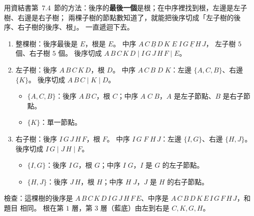 \begin{pastsoln}
用資結書第~7.4~節的方法：後序的\textbf{最後一個}是根；在中序裡找到根，左邊是左子樹、右邊是右子樹；
兩棵子樹的節點數知道了，就能把後序切成「左子樹的後序、右子樹的後序、根」。 一直遞迴下去。
\begin{enumerate}
\item 整棵樹：後序最後是 $E$，根是 $E$。 中序 $\underline{A\,C\,B\,D\,K}\;E\;\underline{I\,G\,F\,H\,J}$，
左子樹 $5$ 個、右子樹 $5$ 個。 後序切成 $A\,B\,C\,K\,D \mid I\,G\,J\,H\,F \mid E$。
\item 左子樹：後序 $A\,B\,C\,K\,D$，根 $D$。 中序 $A\,C\,B\;D\;K$：左邊 $\{A, C, B\}$、右邊 $\{K\}$。
後序切成 $A\,B\,C \mid K \mid D$。
\begin{itemize}
\item $\{A, C, B\}$：後序 $A\,B\,C$，根 $C$；中序 $A\;C\;B$，$A$ 是左子節點、$B$ 是右子節點。
\item $\{K\}$：單一節點。
\end{itemize}
\item 右子樹：後序 $I\,G\,J\,H\,F$，根 $F$。 中序 $I\,G\;F\;H\,J$：左邊 $\{I, G\}$、右邊 $\{H, J\}$。
後序切成 $I\,G \mid J\,H \mid F$。
\begin{itemize}
\item $\{I, G\}$：後序 $I\,G$，根 $G$；中序 $I\;G$，$I$ 是 $G$ 的左子節點。
\item $\{H, J\}$：後序 $J\,H$，根 $H$；中序 $H\;J$，$J$ 是 $H$ 的右子節點。
\end{itemize}
\end{enumerate}
\begin{center}
\end{center}
檢查：這棵樹的後序是 $A\,B\,C\,K\,D\,I\,G\,J\,H\,F\,E$、中序是 $A\,C\,B\,D\,K\,E\,I\,G\,F\,H\,J$，和題目
相同。 根在第 $1$ 層，第 $3$ 層（藍底）由左到右是 $C, K, G, H$。
\end{pastsoln}
